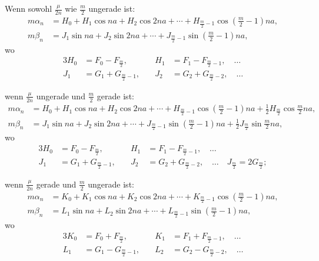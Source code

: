 \documentclass[12pt,a4paper]{article}
\begin{document}
Wenn sowohl $\frac{\mu}{2n}$ wie $\frac{m}{2}$ ungerade ist:
\begin{equation}
\tag{6}
\begin{aligned}
m\alpha_n &= H_0 + H_1 \cos na + H_2 \cos 2na + \cdots + H_{\frac{m}{2}-1} \cos(\tfrac{m}{2}-1)na,\\
m\beta_n &= J_1 \sin na + J_2 \sin 2na + \cdots + J_{\frac{m}{2}-1} \sin(\tfrac{m}{2}-1)na,
\end{aligned}
\end{equation}
wo
\begin{alignat*}{3}
H_0 &= F_0 - F_{\frac{m}{2}}, \quad & H_1 &= F_1 - F_{\frac{m}{2}-1}, \quad \ldots\\
J_1 &= G_1 + G_{\frac{m}{2}-1}, \quad & J_2 &= G_2 + G_{\frac{m}{2}-2}, \quad \ldots
\end{alignat*}

wenn $\frac{\mu}{2n}$ ungerade und $\frac{m}{2}$ gerade ist:
\begin{equation}
\tag{7}
\begin{aligned}
m\alpha_n &= H_0 + H_1 \cos na + H_2 \cos 2na + \cdots + H_{\frac{m}{2}-1} \cos(\tfrac{m}{2}-1)na + \tfrac{1}{2}H_{\frac{m}{2}} \cos\tfrac{m}{2}na,\\
m\beta_n &= J_1 \sin na + J_2 \sin 2na + \cdots + J_{\frac{m}{2}-1} \sin(\tfrac{m}{2}-1)na + \tfrac{1}{2}J_{\frac{m}{2}} \sin\tfrac{m}{2}na,
\end{aligned}
\end{equation}
wo
\begin{alignat*}{3}
H_0 &= F_0 - F_{\frac{m}{2}}, \quad & H_1 &= F_1 - F_{\frac{m}{2}-1}, \quad \ldots\\
J_1 &= G_1 + G_{\frac{m}{2}-1}, \quad & J_2 &= G_2 + G_{\frac{m}{2}-2}, \quad \ldots \quad J_{\frac{m}{2}} = 2G_{\frac{m}{2}};
\end{alignat*}

wenn $\frac{\mu}{2n}$ gerade und $\frac{m}{2}$ ungerade ist:
\begin{equation}
\tag{8}
\begin{aligned}
m\alpha_n &= K_0 + K_1 \cos na + K_2 \cos 2na + \cdots + K_{\frac{m}{2}-1} \cos(\tfrac{m}{2}-1)na,\\
m\beta_n &= L_1 \sin na + L_2 \sin 2na + \cdots + L_{\frac{m}{2}-1} \sin(\tfrac{m}{2}-1)na,
\end{aligned}
\end{equation}
wo
\begin{alignat*}{3}
K_0 &= F_0 + F_{\frac{m}{2}}, \quad & K_1 &= F_1 + F_{\frac{m}{2}-1}, \quad \ldots\\
L_1 &= G_1 - G_{\frac{m}{2}-1}, \quad & L_2 &= G_2 - G_{\frac{m}{2}-2}, \quad \ldots
\end{alignat*}
\end{document}
